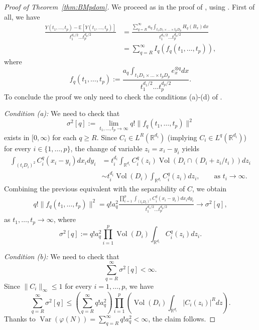 \documentclass[12pt]{article}
\DeclareMathOperator{\var}{Var}
\DeclareMathOperator{\1}{1}
\DeclareMathOperator{\vol}{Vol}
\newcommand{\R}{\mathbb{R}}
\newcommand{\E}{\mathbb{E}}
\theoremstyle{plain}
\theoremstyle{definition}
\begin{document}
\begin{proof}[Proof of Theorem~\ref{thm:BMpdom}]
We proceed as in the proof of \cite[Theorem 7.2.4]{bluebook}, using \cite[Theorem 6.3.1]{bluebook}.
First of all, we have
\begin{align}
    \frac{Y(t_1,\dots,t_p)-\E[Y(t_1,\dots,t_p)]}{t_1^{d_1/2}\ldots t_p^{d_p/2}} &= \frac{\sum_{q=R}^\infty a_q \int_{t_1D_1 \times \dots \times t_pD_p}H_q(B_x)dx}{t_1^{d_1/2}\ldots t_p^{d_p/2}}\\&=\sum_{q=R}^\infty I_q(f_q(t_1,\dots,t_p)),
\end{align}
where 
\[
f_{q}(t_1,\dots,t_p):=\frac{a_q\int_{t_1D_1 \times \dots\times t_pD_p}e_x^{\otimes q}dx}{t_1^{d_1/2}\ldots t_p^{d_p/2}}.
\]
To conclude the proof we only need to check the conditions (a)-(d) of \cite[Theorem 6.3.1]{bluebook}.
\bigskip 

\textit{Condition (a):} We need to check that
$$
\sigma^2[q]:=\lim_{t_1,\ldots,t_p\to\infty}q!\|f_q(t_1,\dots,t_p)\|^2
$$
exists in $[0,\infty)$ for each $q\geq R$.
Since $C_i\in L^R(\R^{d_i})$ (implying $C_i\in L^q(\R^{d_i})$) for every $i\in\{1,\ldots,p\}$, the change of variable $z_i=x_i-y_i$ yields
\begin{align}
    \label{formuletta}\int_{(t_iD_i)^2}C_i^q(x_i-y_i)dx_idy_i&=t_i^{d_i}\int_{\R^{d_i}}C_i^q(z_i)\vol(D_i\cap (D_i+z_i/t_i))dz_i\\
    &\sim t_i^{d_i}\vol(D_i)\int_{\R^{d_i}}C_i^q(z_i)dz_i, \quad \quad \text{as }t_i\rightarrow \infty.
\end{align}
Combining the previous equivalent with the separability of $C$, we obtain
\begin{align}
q!\|f_q(t_1,\dots,t_p)\|^2=q!a_q^2\frac{\prod_{i=1}^p\int_{(t_iD_i)^2}C_i^q(x_i-y_i)dx_idy_i}{t_1^{d_1/2}\ldots t_p^{d_p/2}}\rightarrow \sigma^2[q],
\end{align}
as $t_1,\ldots,t_p\to \infty$, where
\[
\sigma^2[q]:=q!a_q^2
\prod_{i=1}^p\vol(D_i)\int_{\R^{d_i}}C_i^q(z_i)dz_i.
\]


\bigskip

\textit{Condition (b):} We need to check that
\[
\sum_{q=R}^\infty \sigma^2[q]<\infty.
\]
Since $\|C_i\|_\infty\le 1$ for every $i=1,\dots,p$, we have 
\[
\sum_{q=R}^\infty \sigma^2[q]\le 
\left( \sum_{q=R}^\infty q!a_q^2\right)
\prod_{i=1}^p
\left(
\vol(D_i)
\int_{\R^{d_i}}|C_i(z_i)|^Rdz\right).
\]
Thanks to
$\var(\varphi(N))=\sum_{q=R}^\infty q!a_q^2<\infty$, the claim follows.

\bigskip


\end{proof}
\end{document}
